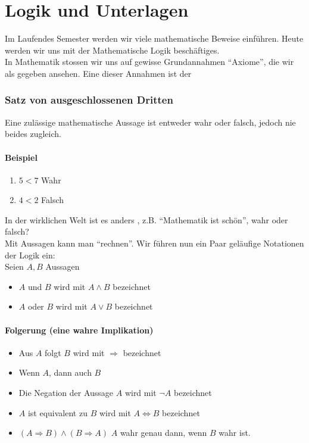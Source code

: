 \chapter{Logik und Unterlagen}
Im Laufendes Semester werden wir viele mathematische Beweise einführen. Heute werden wir uns mit der Mathematische Logik beschäftiges.\\

In Mathematik stossen wir uns auf gewisse Grundannahmen ``Axiome'', die wir als gegeben ansehen. Eine dieser Annahmen ist der 
\subsection*{Satz von ausgeschlossenen Dritten}
Eine zulässige mathematische Aussage ist entweder wahr oder falsch, jedoch nie beides zugleich.
\subsubsection*{Beispiel}
\begin{enumerate}
	\item $5<7$ Wahr
	\item $4<2$ Falsch
\end{enumerate}
In der wirklichen Welt ist es anders , z.B. ``Mathematik ist schön'', wahr oder falsch?\\

Mit Aussagen kann man ``rechnen''. Wir führen nun ein Paar geläufige Notationen der Logik ein:\\
Seien $A,B$ Aussagen
\begin{itemize}
\item $A$ und $B$ wird mit $A\land B$ bezeichnet
\item $A$ oder $B$ wird mit $A\lor B$ bezeichnet
\end{itemize}
\subsubsection*{Folgerung (eine wahre Implikation)}
\begin{itemize}
\item Aus $A$ folgt $B$ wird mit $\Rightarrow$ bezeichnet
\item Wenn $A$, dann auch $B$
\item Die Negation der Aussage $A$ wird mit $\lnot A$ bezeichnet
\item $A$ ist equivalent zu $B$ wird mit $A\Leftrightarrow B$ bezeichnet
\item $\left(A\Rightarrow B\right)\land \left( B\Rightarrow A\right)$ $A$ wahr genau dann, wenn $B$ wahr ist.
\end{itemize}

